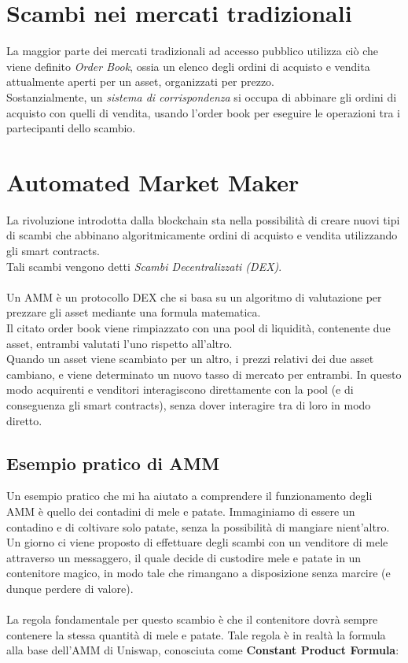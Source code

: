 \documentclass{report}
\begin{document}
\section{Scambi nei mercati tradizionali}

La maggior parte dei mercati tradizionali ad accesso pubblico utilizza ciò che viene definito \textit{Order Book}\cite{order_book}, ossia un elenco degli ordini di acquisto e vendita attualmente aperti per un asset, organizzati per prezzo.
\\Sostanzialmente, un \textit{sistema di corrispondenza}\cite{matching} si occupa di abbinare gli ordini di acquisto con quelli di vendita, usando l'order book per eseguire le operazioni tra i partecipanti dello scambio.


\section{Automated Market Maker}

La rivoluzione introdotta dalla blockchain sta nella possibilità di creare nuovi tipi di scambi che abbinano algoritmicamente ordini di acquisto e vendita utilizzando gli smart contracts.
\\Tali scambi vengono detti \textit{Scambi Decentralizzati (DEX)}.
\\\\Un AMM è un protocollo DEX che si basa su un algoritmo di valutazione per prezzare gli asset mediante una formula matematica.
\\Il citato order book viene rimpiazzato con una pool di liquidità\cite{liquidity_pool}, contenente due asset, entrambi valutati l'uno rispetto all'altro.
\\Quando un asset viene scambiato per un altro, i prezzi relativi dei due asset cambiano, e viene determinato un nuovo tasso di mercato per entrambi.
In questo modo acquirenti e venditori interagiscono direttamente con la pool (e di conseguenza gli smart contracts), senza dover interagire tra di loro in modo diretto.

\subsection{Esempio pratico di AMM}

Un esempio pratico che mi ha aiutato a comprendere il funzionamento degli AMM è quello dei contadini di mele e patate.
Immaginiamo di essere un contadino e di coltivare solo patate, senza la possibilità di mangiare nient'altro.\\ Un giorno ci viene proposto di effettuare degli scambi con un venditore di mele attraverso un messaggero, il quale decide di custodire mele e patate in un contenitore magico, in modo tale che rimangano a disposizione senza marcire (e dunque perdere di valore).
\\\\La regola fondamentale per questo scambio è che il contenitore dovrà sempre contenere la stessa quantità di mele e patate.
Tale regola è in realtà la formula alla base dell'AMM di Uniswap, conosciuta come \textbf{Constant Product Formula}: 
\end{document}
